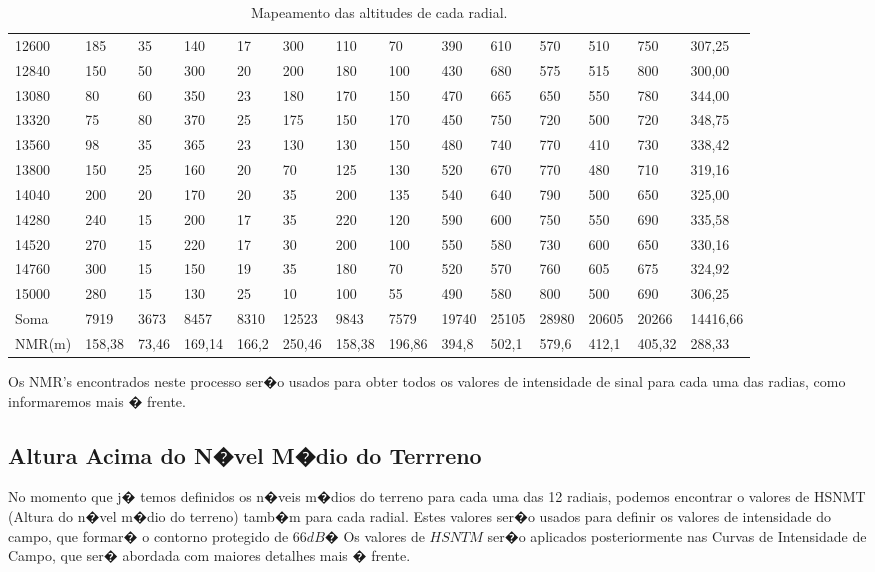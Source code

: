 \begin{table}
\begin{sideways}
\begin{tabular}{|l|l|l|l|l|l|l|l|l|l|l|l|l|l|}
12600 & 185 & 35 & 140 & 17 & 300 & 110 & 70 & 390 & 610 & 570 & 510 & 750 & 307,25\\
12840 & 150 & 50 & 300 & 20 & 200 & 180 & 100 & 430 & 680 & 575 & 515 & 800 & 300,00\\
13080 & 80 & 60 & 350 & 23 & 180 & 170 & 150 & 470 & 665 & 650 & 550 & 780 & 344,00\\
13320 & 75 & 80 & 370 & 25 & 175 & 150 & 170 & 450 & 750 & 720 & 500 & 720 & 348,75\\
13560 & 98 & 35 & 365 & 23 & 130 & 130 & 150 & 480 & 740 & 770 & 410 & 730 & 338,42\\
13800 & 150 & 25 & 160 & 20 & 70 & 125 & 130 & 520 & 670 & 770 & 480 & 710 & 319,16\\
14040 & 200 & 20 & 170 & 20 & 35 & 200 & 135 & 540 & 640 & 790 & 500 & 650 & 325,00\\
14280 & 240 & 15 & 200 & 17 & 35 & 220 & 120 & 590 & 600 & 750 & 550 & 690 & 335,58\\
14520 & 270 & 15 & 220 & 17 & 30 & 200 & 100 & 550 & 580 & 730 & 600 & 650 & 330,16\\
14760 & 300 & 15 & 150 & 19 & 35 & 180 & 70 & 520 & 570 & 760 & 605 & 675 & 324,92\\
15000 & 280 & 15 & 130 & 25 & 10 & 100 & 55 & 490 & 580 & 800 & 500 & 690 & 306,25\\\hline
Soma & 7919 & 3673 & 8457 & 8310 & 12523 & 9843 & 7579 & 19740 & 25105 & 28980 & 20605 & 20266 & 14416,66\\\hline
NMR(m) & 158,38 & 73,46 & 169,14 & 166,2 & 250,46 & 158,38 & 196,86 & 394,8 & 502,1 & 579,6 & 412,1 & 405,32 & 288,33\\ \hline


\end{tabular}
\end{sideways}
\caption{ Mapeamento das altitudes de cada radial. }
\label{tabelaNMT}
\end{table}

Os NMR's encontrados neste processo ser�o usados para obter todos os valores de intensidade de sinal para cada uma das radias, como informaremos mais � 
frente.

\subsection{Altura Acima do N�vel M�dio do Terrreno}

No momento que j� temos definidos os n�veis m�dios do terreno para cada uma das 12 radiais, podemos encontrar o valores de HSNMT (Altura do n�vel m�dio do
terreno)
 tamb�m para cada radial.
Estes valores ser�o usados para definir os valores de intensidade do campo, que formar� o contorno protegido de $66 dB�$
Os valores de $HSNTM$ ser�o aplicados posteriormente nas Curvas de Intensidade de Campo, que ser� abordada com maiores detalhes mais � frente.

